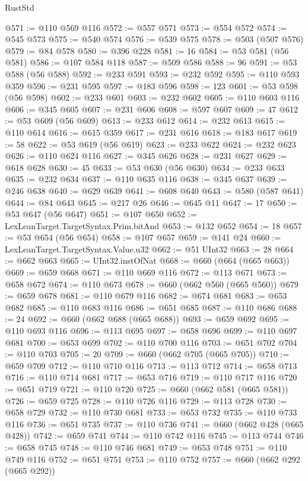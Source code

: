 \begin{lexlean}{RustStd}
\begin{coremodule}
{\begin{coremodule}
{{{{{{{{{{{{{{{{{{{{{{{{{{{{{{{{{{{{{{{{{{{{{{{@571 := @110 @569 @116
@572 := @557 @571
@573 := @554 @572
@574 := @545 @573
@575 := @540 @574
@576 := @539 @575
@578 := @503 (@507 @576)
@579 := @84 @578
@580 := @396 @228
@581 := 16
@584 := @53 @581 (@56 @581)
@586 := @107 @584 @118
@587 := @509 @586
@588 := 96
@591 := @53 @588 (@56 @588)
@592 := @233 @591
@593 := @232 @592
@595 := @110 @593 @359
@596 := @231 @595
@597 := @183 @596
@598 := 123
@601 := @53 @598 (@56 @598)
@602 := @233 @601
@603 := @232 @602
@605 := @110 @603 @116
@606 := @345 @605
@607 := @231 @606
@608 := @597 @607
@609 := 47
@612 := @53 @609 (@56 @609)
@613 := @233 @612
@614 := @232 @613
@615 := @110 @614
@616 := @615 @359
@617 := @231 @616
@618 := @183 @617
@619 := 58
@622 := @53 @619 (@56 @619)
@623 := @233 @622
@624 := @232 @623
@626 := @110 @624 @116
@627 := @345 @626
@628 := @231 @627
@629 := @618 @628
@630 := 45
@633 := @53 @630 (@56 @630)
@634 := @233 @633
@635 := @232 @634
@637 := @110 @635 @116
@638 := @345 @637
@639 := @246 @638
@640 := @629 @639
@641 := @608 @640
@643 := @580 (@587 @641)
@644 := @84 @643
@645 := @217 @26
@646 := @645 @11
@647 := 17
@650 := @53 @647 (@56 @647)
@651 := @107 @650
@652 := LexLeanTarget.TargetSyntax.Prim.bitAnd
@653 := @132 @652
@654 := 18
@657 := @53 @654 (@56 @654)
@658 := @107 @657
@659 := @141 @24
@660 := LexLeanTarget.TargetSyntax.Value.u32
@662 := @51 UInt32
@663 := 28
@664 := @662 @663
@665 := UInt32.instOfNat
@668 := @660 (@664 (@665 @663))
@669 := @659 @668
@671 := @110 @669 @116
@672 := @113 @671
@673 := @658 @672
@674 := @110 @673
@678 := @660 (@662 @560 (@665 @560))
@679 := @659 @678
@681 := @110 @679 @116
@682 := @674 @681
@683 := @653 @682
@685 := @110 @683 @116
@686 := @651 @685
@687 := @110 @686
@688 := 24
@692 := @660 (@662 @688 (@665 @688))
@693 := @659 @692
@695 := @110 @693 @116
@696 := @113 @695
@697 := @658 @696
@699 := @110 @697 @681
@700 := @653 @699
@702 := @110 @700 @116
@703 := @651 @702
@704 := @110 @703
@705 := 20
@709 := @660 (@662 @705 (@665 @705))
@710 := @659 @709
@712 := @110 @710 @116
@713 := @113 @712
@714 := @658 @713
@716 := @110 @714 @681
@717 := @653 @716
@719 := @110 @717 @116
@720 := @651 @719
@721 := @110 @720
@725 := @660 (@662 @581 (@665 @581))
@726 := @659 @725
@728 := @110 @726 @116
@729 := @113 @728
@730 := @658 @729
@732 := @110 @730 @681
@733 := @653 @732
@735 := @110 @733 @116
@736 := @651 @735
@737 := @110 @736
@741 := @660 (@662 @428 (@665 @428))
@742 := @659 @741
@744 := @110 @742 @116
@745 := @113 @744
@746 := @658 @745
@748 := @110 @746 @681
@749 := @653 @748
@751 := @110 @749 @116
@752 := @651 @751
@753 := @110 @752
@757 := @660 (@662 @292 (@665 @292))
}}}}}}}}}}}}}}}}}}}}}}}}}}}}}}}}}}}}}}}}}}}}}}}
\end{coremodule}}
\end{coremodule}
\end{lexlean}
